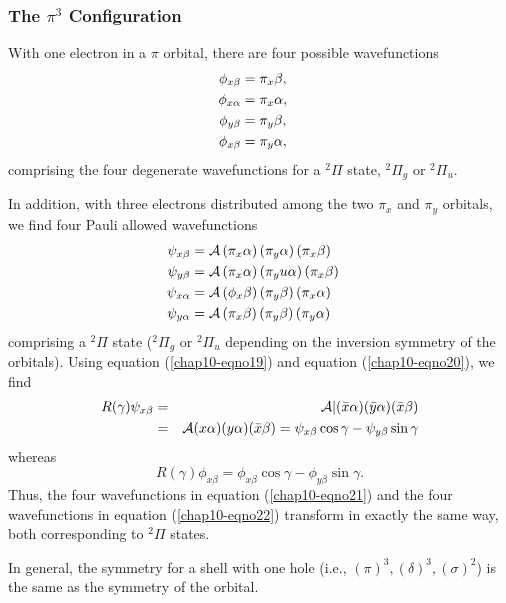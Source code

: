 \subsubsection{The $\pi^3$ Configuration}

With one electron in a $\pi$ orbital, there are four possible wavefunctions
\begin{eqnarray}
\phi_{x \beta} &= \pi_x \beta ,\cr
\phi_{x \alpha} &= \pi_x \alpha ,\cr
\phi_{y \beta} &= \pi_y \beta ,\cr
\phi_{x \beta} &= \pi_y \alpha ,
\label{chap10-eqno21}
\end{eqnarray}
comprising the four degenerate wavefunctions for a ${^2\Pi}$ state, 
${^2\Pi}_g$ or ${^2\Pi}_u$.

In addition, with three electrons distributed among the 
two $\pi_x$ and $\pi_y$ orbitals, we find four Pauli allowed wavefunctions
\begin{eqnarray}
\psi_{x \beta} &= {\cal A} \left( \pi_x \alpha \right) \left( \pi_y 
\alpha \right) \left( \pi_x \beta \right)\cr
\psi_{y \beta} &= {\cal A} \left( \pi_x \alpha \right) \left( \pi_yu 
\alpha \right) \left( \pi_x \beta \right)\cr
\psi_{x \alpha} &= {\cal A} \left( \phi_x \beta \right) \left( \pi_y 
\beta \right) \left( \pi_x \alpha \right)\cr
\psi_{y \alpha} &= {\cal A} \left( \pi_x \beta \right) \left( \pi_y 
\beta \right) \left( \pi_y \alpha \right)
\label{chap10-eqno22}
\end{eqnarray}
comprising a ${^2\Pi}$ state (${^2\Pi}_g$ or ${^2\Pi}_u$ depending on
the inversion symmetry of the orbitals). Using equation
(\ref{chap10-eqno19}) and equation (\ref{chap10-eqno20}), we find
\begin{eqnarray}
R ( \gamma ) \psi_{x \beta} &=& {\cal A}| ( {\bar{x}} \alpha ) ( 
{\bar{y}} \alpha ) ( {\bar{x}} \beta )\cr
&=& {\cal A} ( x \alpha ) ( y \alpha ) ( {\bar{x}} \beta ) = \psi_{x 
\beta} \cos \gamma - \psi_{y \beta} \sin \gamma
\end{eqnarray}
whereas
\begin{equation}
R ( \gamma ) \phi_{x \beta} = \phi_{x \beta} \cos \gamma - \phi_{y 
\beta} \sin \gamma .
\end{equation}
Thus, the four wavefunctions in equation (\ref{chap10-eqno21}) and the
four wavefunctions in equation (\ref{chap10-eqno22}) transform in
exactly the same way, both corresponding to ${^2\Pi}$ states.

In general, the symmetry for a shell with one hole (i.e., $(\pi)^3 ,
(\delta)^3,(\sigma)^2$) is the same as the symmetry of the orbital.

